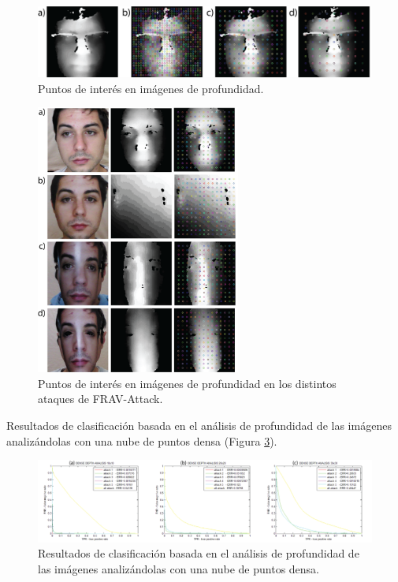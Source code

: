 \begin{figure}
\centering
\includegraphics[width=1\textwidth]{ch-sistemasABC/images/ch-evaluacion_topologias/PUNTOS_DE_INTERES_EN_IMGS_PROFUNDIDAD.png}
    \caption{Puntos de interés en imágenes de profundidad.}
    \label{fig:PUNTOS_DE_INTERES_EN_IMAGENES_DE_PROFUNDIDAD}
\end{figure}
 
\begin{figure}
\centering
\includegraphics[width=0.6\textwidth]{ch-sistemasABC/images/ch-evaluacion_topologias/PUNTOS_DE_INTERES_EN_IMGS_PROFUNDIDAD_2.png}
    \caption{Puntos de interés en imágenes de profundidad en los distintos ataques de \Gls{FRAV-Attack}.}
    \label{fig:PUNTOS_DE_INTERES_EN_IMAGENES_DE_PROFUNDIDAD_EN_ATAQUES}
\end{figure}

Resultados de clasificación basada en el análisis de profundidad de las imágenes analizándolas con una nube de puntos densa (Figura \ref{fig:RESULTADOS_PROFUNDIDAD_DENSA}).

\begin{figure}
\centering
\includegraphics[width=1\textwidth]{ch-sistemasABC/images/ch-evaluacion_topologias/RESULTADOS_PROFUNDIDAD_DENSA.png}
    \caption{Resultados de clasificación basada en el análisis de profundidad de las imágenes analizándolas con una nube de puntos densa.}
    \label{fig:RESULTADOS_PROFUNDIDAD_DENSA}
\end{figure}


